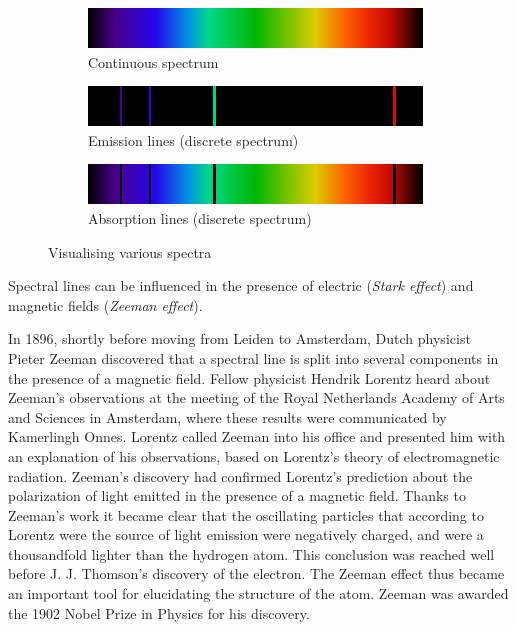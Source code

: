 \documentclass[%
 reprint,
nofootinbib,
 amsmath,amssymb,
 aps,
floatfix,
]{revtex4-2}
\begin{document}
    \begin{figure}
     \centering
     \begin{subfigure}[b]{0.45\textwidth}
         \centering
         \includegraphics[scale = 0.45]{Figures/continuous.png}
         \caption{Continuous spectrum}
         \label{fig:y equals x}
     \end{subfigure}
     \hfill
     \begin{subfigure}[b]{0.45\textwidth}
         \centering
         \includegraphics[scale = 0.45]{Figures/emission.png}
         \caption{Emission lines (discrete spectrum)}
         \label{fig:three sin x}
     \end{subfigure}
     \hfill
     \begin{subfigure}[b]{0.45\textwidth}
         \centering
         \includegraphics[scale = 0.45]{Figures/absorption.png}
         \caption{Absorption lines (discrete spectrum)}
         \label{fig:five over x}
     \end{subfigure}
        \caption{Visualising various spectra}
        \label{fig:three graphs}
    \end{figure}
    \par
    Spectral lines can be influenced in the presence of electric (\textit{Stark effect}) and magnetic fields (\textit{Zeeman effect}).
    \par
    In 1896, shortly before moving from Leiden to Amsterdam, Dutch physicist Pieter Zeeman discovered that a spectral line is split into several components in the presence of a magnetic field. Fellow physicist Hendrik Lorentz heard about Zeeman's observations at the meeting of the Royal Netherlands Academy of Arts and Sciences in Amsterdam, where these results were communicated by Kamerlingh Onnes. Lorentz called Zeeman into his office and presented him with an explanation of his observations, based on Lorentz's theory of electromagnetic radiation. Zeeman's discovery had confirmed Lorentz's prediction about the polarization of light emitted in the presence of a magnetic field. Thanks to Zeeman's work it became clear that the oscillating particles that according to Lorentz were the source of light emission were negatively charged, and were a thousandfold lighter than the hydrogen atom. This conclusion was reached well before J. J. Thomson's discovery of the electron. The Zeeman effect thus became an important tool for elucidating the structure of the atom. Zeeman was awarded the 1902 Nobel Prize in Physics for his discovery. 
\end{document}
